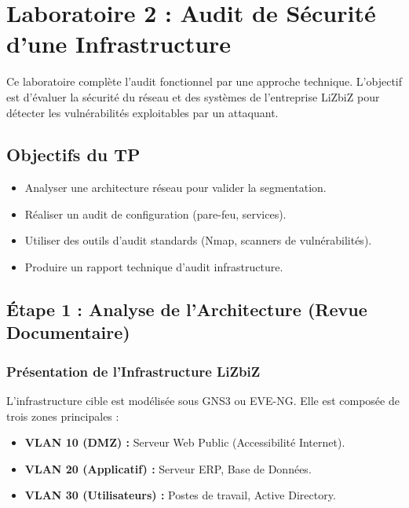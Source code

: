 
\chapter{Laboratoire 2 : Audit de Sécurité d'une Infrastructure}\label{chap:lab2_infrastructure}

Ce laboratoire complète l'audit fonctionnel par une approche technique. L'objectif est d'évaluer la sécurité du réseau et des systèmes de l'entreprise LiZbiZ pour détecter les vulnérabilités exploitables par un attaquant.

\section{Objectifs du TP}
\begin{itemize}
    \item Analyser une architecture réseau pour valider la segmentation.
    \item Réaliser un audit de configuration (pare-feu, services).
    \item Utiliser des outils d'audit standards (Nmap, scanners de vulnérabilités).
    \item Produire un rapport technique d'audit infrastructure.
\end{itemize}

\section{Étape 1 : Analyse de l'Architecture (Revue Documentaire)}

\subsection{Présentation de l'Infrastructure LiZbiZ}

L'infrastructure cible est modélisée sous GNS3 ou EVE-NG. Elle est composée de trois zones principales :

\begin{itemize}
    \item \textbf{VLAN 10 (DMZ) :} Serveur Web Public (Accessibilité Internet).
    \item \textbf{VLAN 20 (Applicatif) :} Serveur ERP, Base de Données.
    \item \textbf{VLAN 30 (Utilisateurs) :} Postes de travail, Active Directory.
\end{itemize}

